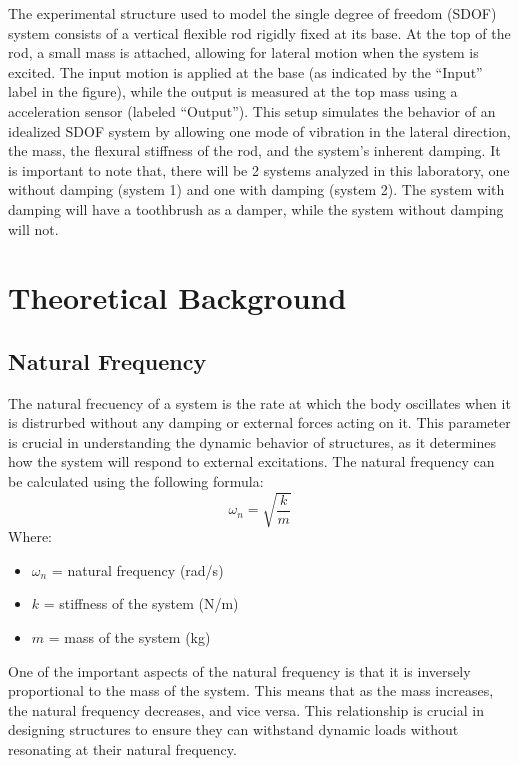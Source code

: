 \documentclass{article}  %
\begin{document}
The experimental structure used to model the single degree of freedom (SDOF) system consists of a vertical flexible rod rigidly fixed at its base. At the top of the rod, a small mass is attached, allowing for lateral motion when the system is excited. The input motion is applied at the base (as indicated by the “Input” label in the figure), while the output is measured at the top mass using a acceleration sensor (labeled “Output”). This setup simulates the behavior of an idealized SDOF system by allowing one mode of vibration in the lateral direction, the mass, the flexural stiffness of the rod, and the system's inherent damping. It is important to note that, there will be 2 systems analyzed in this laboratory, one without damping (system 1) and one with damping (system 2). The system with damping will have a toothbrush as a damper, while the system without damping will not. 




\newpage

\section{Theoretical Background}

\subsection{Natural Frequency}
The natural frecuency of a system is the rate at which the body oscillates when it is distrurbed without any damping or external forces acting on it. This parameter is crucial in understanding the dynamic behavior of structures, as it determines how the system will respond to external excitations. The natural frequency can be calculated using the following formula:
\begin{equation}
\omega_n = \sqrt{\frac{k}{m}}
\end{equation}
Where:
\begin{itemize}
  \item $\omega_n$ = natural frequency (rad/s)
  \item $k$ = stiffness of the system (N/m)
  \item $m$ = mass of the system (kg)
\end{itemize}

One of the important aspects of the natural frequency is that it is inversely proportional to the mass of the system. This means that as the mass increases, the natural frequency decreases, and vice versa. This relationship is crucial in designing structures to ensure they can withstand dynamic loads without resonating at their natural frequency.
\end{document}
